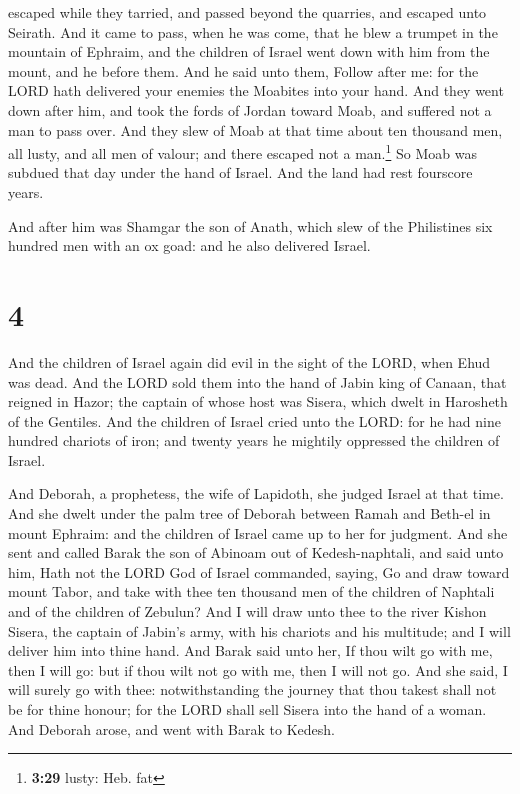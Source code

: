 escaped while they tarried, and passed beyond the quarries, and escaped
unto Seirath.  And it came to pass, when he was come,
that he blew a trumpet in the mountain of Ephraim, and the children of
Israel went down with him from the mount, and he before them.
 And he said unto them, Follow after me: for the LORD
hath delivered your enemies the Moabites into your hand. And they went
down after him, and took the fords of Jordan toward Moab, and suffered
not a man to pass over.  And they slew of Moab at that
time about ten thousand men, all lusty, and all men of valour; and there
escaped not a man.\footnote{\textbf{3:29} lusty: Heb. fat}
 So Moab was subdued that day under the hand of Israel.
And the land had rest fourscore years.

 And after him was Shamgar the son of Anath, which slew
of the Philistines six hundred men with an ox goad: and he also
delivered Israel.

\hypertarget{section-3}{%
\section{4}\label{section-3}}

 And the children of Israel again did evil in the sight of
the LORD, when Ehud was dead.  And the LORD sold them into
the hand of Jabin king of Canaan, that reigned in Hazor; the captain of
whose host was Sisera, which dwelt in Harosheth of the Gentiles.
 And the children of Israel cried unto the LORD: for he
had nine hundred chariots of iron; and twenty years he mightily
oppressed the children of Israel.

 And Deborah, a prophetess, the wife of Lapidoth, she
judged Israel at that time.  And she dwelt under the palm
tree of Deborah between Ramah and Beth-el in mount Ephraim: and the
children of Israel came up to her for judgment.  And she
sent and called Barak the son of Abinoam out of Kedesh-naphtali, and
said unto him, Hath not the LORD God of Israel commanded, saying, Go and
draw toward mount Tabor, and take with thee ten thousand men of the
children of Naphtali and of the children of Zebulun?  And
I will draw unto thee to the river Kishon Sisera, the captain of Jabin's
army, with his chariots and his multitude; and I will deliver him into
thine hand.  And Barak said unto her, If thou wilt go with
me, then I will go: but if thou wilt not go with me, then I will not go.
 And she said, I will surely go with thee: notwithstanding
the journey that thou takest shall not be for thine honour; for the LORD
shall sell Sisera into the hand of a woman. And Deborah arose, and went
with Barak to Kedesh.

